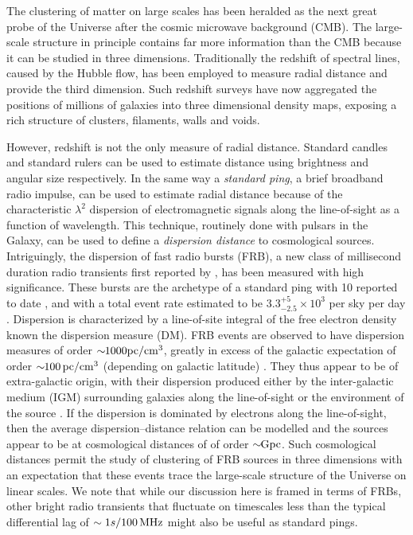 \documentclass[twocolumn,prl,nofootinbib,floatfix]{revtex4-1}
\begin{document}
The clustering of matter on large scales has been
heralded as the next great probe of the Universe after the cosmic microwave
background (CMB). The large-scale structure in principle contains far more
information than the CMB because it can be studied in three dimensions.
Traditionally the redshift of spectral lines, caused by the Hubble flow, has
been employed to measure radial distance and provide the third dimension.
Such redshift
surveys have now aggregated the positions of millions of galaxies into three
dimensional density maps, exposing a rich structure of clusters, filaments,
walls and voids.

However, redshift is not the only measure of radial distance.   Standard
candles and standard rulers can be used to estimate distance using brightness
and angular size respectively.  In the same way a \emph{standard ping}, a brief
broadband radio impulse, can be used to estimate radial distance because of the
characteristic $\lambda^2$ dispersion of electromagnetic signals along the
line-of-sight as a function of wavelength.  This technique, routinely done with
pulsars in the Galaxy, can be used to define a \emph{dispersion distance} to
cosmological sources.  Intriguingly, the dispersion of fast radio bursts (FRB),
a new class of millisecond duration radio transients first reported by
\citet{2007Sci...318..777L}, has been measured with high significance.  These
bursts are the archetype of a standard ping with 10 reported to date
\citep{2012MNRAS.425L..71K,2013Sci...341...53T, 2014ApJ...790..101S,
2014ApJ...792...19B, 2015MNRAS.447..246P,2015ApJ...799L...5R}, and with a total
event rate estimated to be $3.3^{+5}_{-2.5} \times 10^3$ per sky per
day \cite{2015arXiv150500834R}.  Dispersion is characterized by a line-of-site
integral of the free electron density known the dispersion measure (DM).  FRB
events are observed to have dispersion measures of order $\sim\!\!1000 {\rm pc}
/ {\rm cm}^3$, greatly in excess of the galactic expectation of order
$\sim\!\!100\,{\rm pc} / {\rm cm}^3$ (depending on galactic latitude)
\cite{2014arXiv1412.4829D}.  They thus appear to be of extra-galactic origin,
with their dispersion produced either by the inter-galactic medium (IGM)
\citep{2013Sci...341...53T} surrounding galaxies along the line-of-sight
or the environment of the
source \citep{2014ApJ...785L..26L,2015arXiv150101341P,2015arXiv150505535C}.  If
the dispersion is dominated by electrons along the line-of-sight, then the
average dispersion--distance relation can be modelled
\citep{2014ApJ...797...71Z,2004MNRAS.348..999I, 2003ApJ...598L..79I} and the
sources appear to be at cosmological distances of of order $\sim\!\!{\rm Gpc}$.
Such cosmological distances permit the study of clustering of FRB sources in
three dimensions with an expectation that these events trace the large-scale
structure of the Universe on linear scales. We note that while our discussion
here is framed in terms of FRBs, other bright radio transients that fluctuate
on timescales less than the typical differential lag of $\sim 1s/100 \,{\rm
MHz} $ might also be useful as standard pings.
\end{document}
